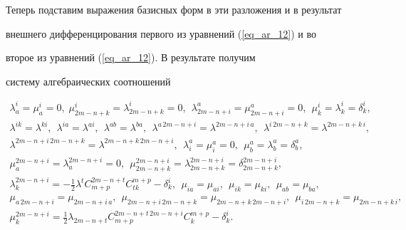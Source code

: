 Теперь подставим выражения базисных форм в эти разложения и в результат


внешнего дифференцирования первого из уравнений (\ref{eq_ar_12}) и во


второе из уравнений (\ref{eq_ar_12}). В результате получим 


систему алгебраических соотношений


\begin{gather*}


\lambda^i_a=\mu^i_a=0,\;\mu^i_{2m-n+k}=\lambda^i_{2m-n+k}=0,\ \


\lambda^a_{2m-n+i}=\mu^a_{2m-n+i}=0,\ \ \mu^i_k=\lambda^i_k=\delta^i_k,\\


%


\lambda^{ik}=\lambda^{ki},\ \ \lambda^{ia}=\lambda^{ai},\ \


\lambda^{ab}=\lambda^{ba},\ \ \lambda^{a\, 2m-n+i}=\lambda^{2m-n+i\, a},\ \


\lambda^{i\, 2m-n+k}=\lambda^{2m-n+k\, i},\\


%


\lambda^{2m-n+i\, 2m-n+k}=\lambda^{2m-n+k\, 2m-n+i},\ \ \lambda^a_i=


\mu^a_i=0,\ \ \mu^a_b=\lambda^a_b=\delta^a_b,\\


%


\mu^{2m-n+i}_a= \lambda^{2m-n+i}_a=0,\ \ \mu^{2m-n+i}_{2m-


n+k}=\lambda^{2m-n+i}_{2m-n+k}=\delta^{2m-n+i}_{2m-n+k},\\


%


{ \lambda^{2m-n+i}_k=-\frac{1}{2}\lambda^tC^{2m-


n+t}_{m+p}C^{m+p}_{tk}-\delta^i_k, }\ \


\mu_{ia}=\mu_{ai}, \ \ \mu_{ik}=\mu_{ki},\ \ \mu_{ab}=\mu_{ba},\\


%


{\mu_{a\, 2m-n+i}=\mu_{2m-n+i\, a},\ \ \mu_{2m-n+i\, 2m-


n+k}=\mu_{2m-n+k\, 2m-n+i},\ \ \mu_{i\, 2m-n+k}=\mu_{2m-n+k\, i},}\\


%


{\mu^{2m-n+i}_k=\frac{1}{2}\lambda_{2m-n+t}C^{2m-n+t\, 2m-


n+i}_{m+p}C^{m+p}_k-\delta^i_k. }


\end{gather*}





